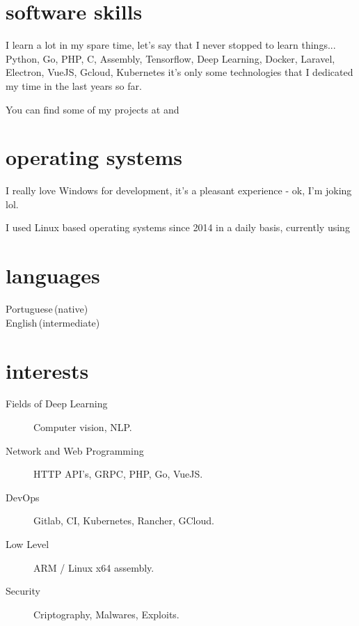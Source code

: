 \documentclass[]{cv-mauri}
\begin{document}
\section*{software skills}
    I learn a lot in my spare time, let's say that I never stopped to learn things... Python, Go, PHP, C, Assembly, Tensorflow, Deep Learning, Docker, Laravel, Electron, VueJS, Gcloud, Kubernetes it's only some technologies that I dedicated my time in the last years so far.

    You can find some of my projects at \href{https://github.com/mauri870}{\color{maincolor}{https://github.com/mauri870}} and \href{https://mauri870.github.io}{\color{maincolor}{https://mauri870.github.io}}

\section*{operating systems}
	I really love Windows for development, it's a pleasant experience - ok, I'm joking lol.
	
	I used Linux based operating systems since 2014 in a daily basis, currently using \href{https://github.com/mauri870/dot-files}{} 

\section*{languages}
\begin{tabularcv}
    Portuguese\,(native)\\[\vspacepar]
    English\,(intermediate)
\end{tabularcv}

\section*{interests}
	\begin{description}
		\item [Fields of Deep Learning] Computer vision, NLP.
		\item [Network and Web Programming] HTTP API's, GRPC, PHP, Go, VueJS.
		\item [DevOps] Gitlab, CI, Kubernetes, Rancher, GCloud.
		\item [Low Level] ARM / Linux x64 assembly.
		\item [Security] Criptography, Malwares, Exploits.
	\end{description}
\end{document}
